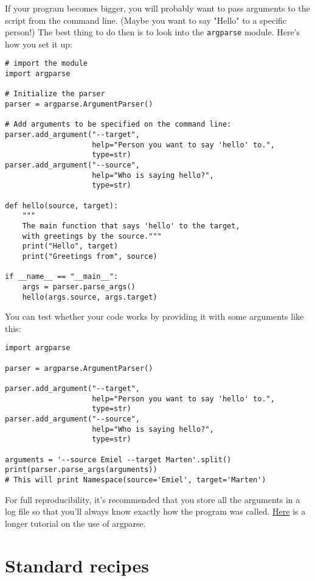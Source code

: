 \documentclass[12pt]{book}
\begin{document}
If your program becomes bigger, you will probably want to pass arguments to the script from the command line. (Maybe you want to say "Hello" to a specific person!) The best thing to do then is to look into the \texttt{argparse} module. Here's how you set it up:

\begin{lstlisting}
# import the module
import argparse

# Initialize the parser
parser = argparse.ArgumentParser()

# Add arguments to be specified on the command line:
parser.add_argument("--target", 
                    help="Person you want to say 'hello' to.", 
                    type=str)
parser.add_argument("--source", 
                    help="Who is saying hello?", 
                    type=str)

def hello(source, target):
    """
    The main function that says 'hello' to the target, 
    with greetings by the source."""
    print("Hello", target)
    print("Greetings from", source)

if __name__ == "__main__":
    args = parser.parse_args()
    hello(args.source, args.target)
\end{lstlisting}

You can test whether your code works by providing it with some arguments like this:

\begin{lstlisting}
import argparse

parser = argparse.ArgumentParser()

parser.add_argument("--target", 
                    help="Person you want to say 'hello' to.", 
                    type=str)
parser.add_argument("--source", 
                    help="Who is saying hello?", 
                    type=str)

arguments = '--source Emiel --target Marten'.split()
print(parser.parse_args(arguments))
# This will print Namespace(source='Emiel', target='Marten')
\end{lstlisting}

For full reproducibility, it's recommended that you store all the arguments in a log file so that you'll always know exactly how the program was called. \href{https://docs.python.org/3/howto/argparse.html}{Here} is a longer
tutorial on the use of argparse.

\chapter{Standard recipes}
\end{document}
